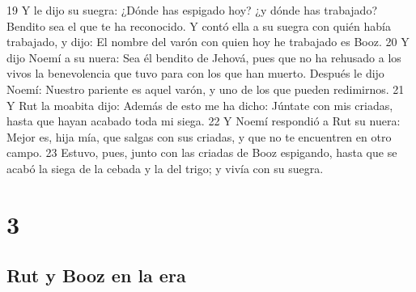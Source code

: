 19 Y le dijo su suegra: ¿Dónde has espigado hoy? ¿y dónde has trabajado? Bendito sea el que te ha reconocido. Y contó ella a su suegra con quién había trabajado, y dijo: El nombre del varón con quien hoy he trabajado es Booz.
20 Y dijo Noemí a su nuera: Sea él bendito de Jehová, pues que no ha rehusado a los vivos la benevolencia que tuvo para con los que han muerto. Después le dijo Noemí: Nuestro pariente es aquel varón, y uno de los que pueden redimirnos.
21 Y Rut la moabita dijo: Además de esto me ha dicho: Júntate con mis criadas, hasta que hayan acabado toda mi siega.
22 Y Noemí respondió a Rut su nuera: Mejor es, hija mía, que salgas con sus criadas, y que no te encuentren en otro campo.
23 Estuvo, pues, junto con las criadas de Booz espigando, hasta que se acabó la siega de la cebada y la del trigo; y vivía con su suegra.

\chapter{3}

\section*{Rut y Booz en la era}


